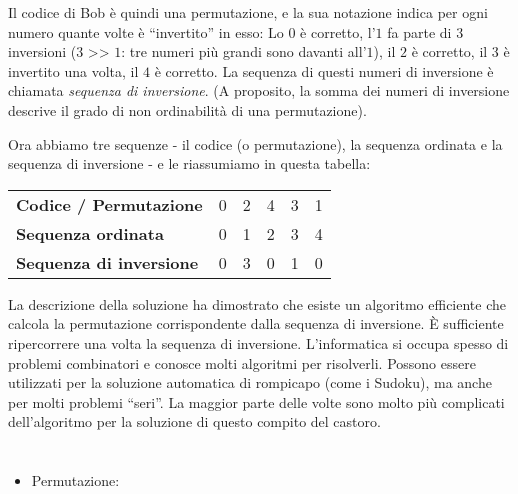{{Il codice di Bob è quindi una permutazione, e la sua notazione indica per ogni numero quante volte è \enquote{invertito} in esso:
Lo $0$ è corretto, l’$1$ fa parte di $3$ inversioni ($3$ >\textcompwordmark{}> $1$: tre numeri più grandi sono davanti all’$1$),
il $2$ è corretto, il $3$ è invertito una volta, il $4$ è corretto.
La sequenza di questi numeri di inversione è chiamata \emph{sequenza di inversione}.
(A proposito, la somma dei numeri di inversione descrive il grado di non ordinabilità di una permutazione).

Ora abbiamo tre sequenze - il codice (o permutazione), la sequenza ordinata e la sequenza di inversione - e le riassumiamo in questa tabella:

\begin{adjustwidth}{1.5em}{0em}
\begin{tabular}{ @{} l l l l l l @{} }
  \textbf{Codice / Permutazione} & 0 & 2 & 4 & 3 & 1 \\ 
  \textbf{Sequenza ordinata} & 0 & 1 & 2 & 3 & 4 \\ 
  \textbf{Sequenza di inversione} & 0 & 3 & 0 & 1 & 0
\end{tabular}


\end{adjustwidth}

La descrizione della soluzione ha dimostrato che esiste un algoritmo efficiente che calcola la permutazione corrispondente dalla sequenza di inversione. È sufficiente ripercorrere una volta la sequenza di inversione. L’informatica si occupa spesso di problemi combinatori e conosce molti algoritmi per risolverli. Possono essere utilizzati per la soluzione automatica di rompicapo (come i Sudoku), ma anche per molti problemi \enquote{seri}. La maggior parte delle volte sono molto più complicati dell’algoritmo per la soluzione di questo compito del castoro.



\section*{\BrochureWebsitesAndKeywords}
{\raggedright
\begin{itemize}
  \item Permutazione: \href{https://it.wikipedia.org/wiki/Permutazione}{}
\end{itemize}


}}}
